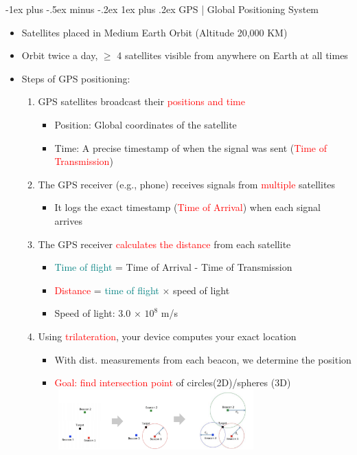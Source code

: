 \documentclass[10pt,landscape]{article}
\makeatletter
\newcommand{\subsubsubsection}{\@startsection{subsubsection}{3}{0mm}%
                                {-1ex plus -.5ex minus -.2ex}%
                                {1ex plus .2ex}%
                                {\normalfont\scriptsize\bfseries}}
\newcommand{\1}{\mathmybb{1}}
\makeatother
\begin{document}
\begin{multicols*}{3}
\subsubsubsection{GPS | Global Positioning System}
\begin{itemize}
  \item Satellites placed in Medium Earth Orbit (Altitude 20,000 KM)
  \item Orbit twice a day, $\geq$ 4 satellites visible from anywhere on Earth at all times
  \item Steps of GPS positioning:
  \begin{enumerate}
    \item GPS satellites broadcast their \textcolor{red}{positions and time}
    \begin{itemize}
      \item Position: Global coordinates of the satellite
      \item Time: A precise timestamp of when the signal was sent (\textcolor{red}{Time of Transmission})
    \end{itemize}
    \item The GPS receiver (e.g., phone) receives signals from \textcolor{red}{multiple} satellites
    \begin{itemize}
      \item It logs the exact timestamp (\textcolor{red}{Time of Arrival}) when each signal arrives
    \end{itemize}
    \item The GPS receiver \textcolor{red}{calculates the distance} from each satellite
    \begin{itemize}
      \item \textcolor{teal}{Time of flight} = Time of Arrival - Time of Transmission
      \item \textcolor{red}{Distance} = \textcolor{teal}{time of flight} $\times$ speed of light
      \item Speed of light: 3.0 × $10^8$ m/s
    \end{itemize}
    \item Using \textcolor{red}{trilateration}, your device computes your exact location
    \begin{itemize}
      \item With dist. measurements from each beacon, we determine the position
      \item \textcolor{red}{Goal: find intersection point} of circles(2D)/spheres (3D) 
      \includegraphics*[width=7.8cm, height=2.3cm]{images/trilateration.png}

\end{itemize}
\end{enumerate}
\end{itemize}
\end{multicols*}
\end{document}
